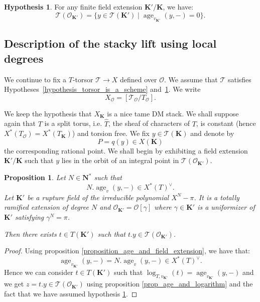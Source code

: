 \documentclass{proc-l}
\newcommand{\K}{\mathbf{K}}
\newcommand{\N}{\mathbf{N}}
\DeclareMathOperator{\age}{age}
\newcommand{\stackT}{\mathcal{T}}
\newcommand{\sheafO}{\mathcal{O}}
\newtheorem{prop}[theorem]{Proposition}
\theoremstyle{definition}
\newtheorem{hypothesis}[theorem]{Hypothesis}
\theoremstyle{remark}
\numberwithin{equation}{section}
\begin{document}
\begin{hypothesis}\label{hypothesis_zero_of_local_degree}
    For any finite field extension $\K' / \K$, we have:
    $$\stackT(\sheafO_{\K'}) = \{y \in \stackT(\K') \mid \age_{v_{\K'}}(y,-) = 0 \} . $$
\end{hypothesis}









\subsection{Description of the stacky lift using local degrees}\label{paragraph_wild_residue_map}



We continue to fix a $T$-torsor $\stackT \rightarrow X$ defined over $\sheafO$.
We assume that $\stackT$ satisfies Hypotheses~\ref{hypothesis_torsor_is_a_scheme}
and~\ref{hypothesis_zero_of_local_degree}.
We write
\[
X_{\sheafO} = [\stackT_{\sheafO} / T_{\sheafO}] .
\]

We keep the hypothesis that $X_{\K}$ is a nice tame DM stack.
We shall suppose again that $T$ is a split torus, i.e. $\widehat{T}$, the sheaf of characters of $T$, is constant
(hence $X^{*}(T_{\sheafO}) = X^{*}(T_{\K})$) and torsion free. We fix $y \in \stackT(\K)$ and denote by
\[
P = q(y) \in X(\K)
\]
the corresponding rational point. We shall begin by exhibiting a field extension
$\K'/\K$ such that $y$ lies in the orbit of an integral point in
$\stackT(\sheafO_{\K'})$.
 

\begin{prop}
Let  $N \in \N^*$ such that $$N . \age_v(y,-) \in X^*(T)^{\vee} .$$Let $\K'$ be a rupture field of the irreducible polynomial $X^N - \pi$. It is a totally ramified extension of degree $N$ and $\sheafO_{\K'} = \sheafO[\gamma]$ where $\gamma \in \K'$ is a uniformizer of $\K'$ satisfying $\gamma^N = \pi$.

Then there exists $t \in T(\K')$ such that $t . y \in \stackT(\sheafO_{\K'})$.
\end{prop}

\begin{proof}
Using proposition \ref{proposition_age_and_field_extension}, we have that:
$$\age_{v_{\K'}}(y,-) = N . \age_v(y,-) \in X^*(T)^{\vee} .$$Hence we can consider $t \in T(\K')$ such that $\log_{T,v_{\K'}}(t) = \age_{v_{\K'}}(y,-)$ and we get $z = t . y \in \stackT(\sheafO_{\K'})$ using proposition \ref{prop_age_and_logarithm} and the fact that we have assumed hypothesis \ref{hypothesis_zero_of_local_degree}.
\end{proof}
\end{document}

